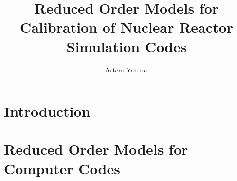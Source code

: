 \documentclass[thesis]{thesis-umich}
\title{Reduced Order Models for Calibration of Nuclear Reactor Simulation Codes}
\author{Artem Yankov}
\begin{document}
\chapter{Introduction}   \label{chap:intro}



\chapter{Reduced Order Models for Computer Codes} \label{chap:rom}




\end{document}
